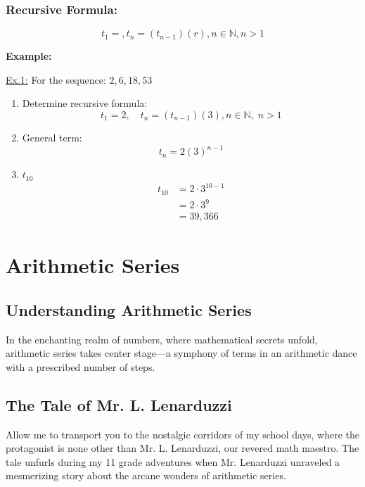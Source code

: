 \documentclass[12pt,a4paper]{article}
\newenvironment{example}
  {\begin{framed}\colorbox{examplecolor}{
  \parbox{\dimexpr\linewidth-2\fboxsep}{
  \textbf{Example:}}}}
  {\end{framed}}
\begin{document}
\subsubsection*{Recursive Formula:}
\begin{equation*}
    t_1=,t_n=(t_{n-1})(r), n \in \mathbb{N}, n>1
\end{equation*}
\begin{example}
    \underline{Ex.1:} For the sequence: $2, 6, 18, 53$
    \begin{enumerate}[label=(\alph*), align=left, left=0pt, labelwidth=1.5em, labelsep=1em]
        \item Determine recursive formula: 
        \[
        t_1 = 2, \quad t_n = (t_{n-1}) (3), n \in \mathbb{N}, \; n > 1
        \]
        \item General term: 
        \[
        t_n = 2 (3)^{n-1}
        \]
        \item $t_{10}$
        \begin{align*}
            t_{10} &= 2 \cdot 3^{10-1} \\
                   &= 2 \cdot 3^9 \\
                   &= 39,366
        \end{align*}
    \end{enumerate}
\end{example}
\section*{Arithmetic Series}
\subsection*{Understanding Arithmetic Series}

In the enchanting realm of numbers, where mathematical secrets unfold, arithmetic series takes center stage—a symphony of terms in an arithmetic dance with a prescribed number of steps.

\subsection*{The Tale of Mr. L. Lenarduzzi}

Allow me to transport you to the nostalgic corridors of my school days, where the protagonist is none other than Mr. L. Lenarduzzi, our revered math maestro. The tale unfurls during my 11 grade adventures when Mr. Lenarduzzi unraveled a mesmerizing story about the arcane wonders of arithmetic series.
\end{document}
